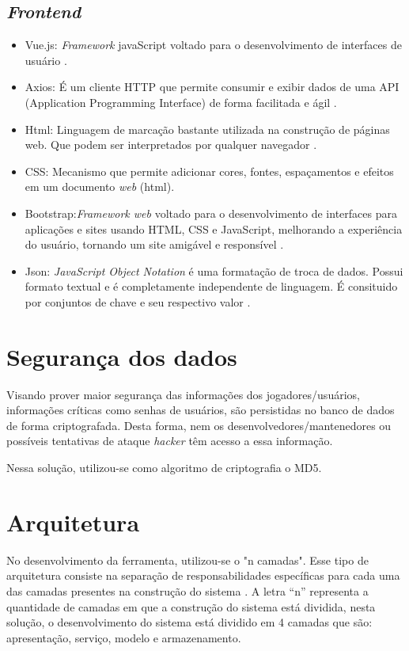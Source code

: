 \subsection{\textit{Frontend}}
\begin{itemize}
	\item Vue.js: \textit{Framework} javaScript voltado para o desenvolvimento de interfaces de usuário \cite{vue}.
	\item Axios: É um cliente HTTP que permite consumir e exibir dados de uma API (Application Programming Interface) de forma facilitada e ágil \cite{axios}.
	\item Html: Linguagem de marcação bastante utilizada na construção de páginas web. Que podem ser interpretados por 
		qualquer navegador \cite{html}.
	\item CSS: Mecanismo que permite adicionar cores, fontes, espaçamentos e efeitos em um documento \textit{web} (html). \cite{css}
	\item Bootstrap:\textit{Framework web} voltado para o desenvolvimento de interfaces para aplicações e sites usando HTML, CSS e JavaScript, melhorando
		a experiência do usuário, tornando um site amigável e responsível \cite{bootstrap}.
	\item Json: \textit{JavaScript Object Notation} é uma formatação de troca de dados. Possui formato textual e é completamente independente de linguagem. É
		consituido por conjuntos de chave e seu respectivo valor \cite{json}.
\end{itemize}

\section{Segurança dos dados}
Visando prover maior segurança das informações dos jogadores/usuários, informações críticas como senhas de usuários,
são persistidas no banco de dados de forma criptografada. Desta forma, nem os desenvolvedores/mantenedores ou possíveis 
tentativas de ataque \textit{hacker} têm acesso a essa informação.

Nessa solução, utilizou-se como algoritmo de criptografia o MD5.

\section{Arquitetura}

No desenvolvimento da ferramenta, utilizou-se o "n camadas". Esse tipo
de arquitetura consiste na separação de responsabilidades específicas para cada uma das camadas presentes 
na construção do sistema \cite{MSF}. A letra ``n'' representa a quantidade de camadas em que a construção do sistema 
está dividida, nesta solução, o desenvolvimento do sistema está dividido em 4 camadas que são: apresentação, serviço, modelo
e armazenamento.

